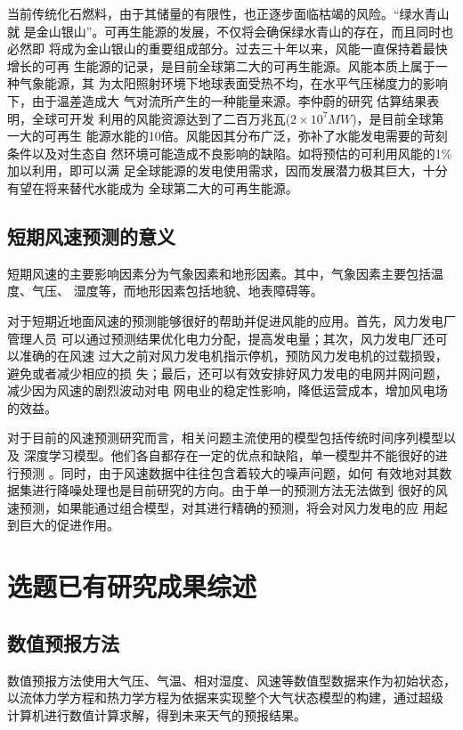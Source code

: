 \documentclass[AutoFakeBold]{LZUThesis}
\begin{document}
当前传统化石燃料，由于其储量的有限性，也正逐步面临枯竭的风险。“绿水青山就
是金山银山”。可再生能源的发展，不仅将会确保绿水青山的存在，而且同时也必然即
将成为金山银山的重要组成部分。过去三十年以来，风能一直保持着最快增长的可再
生能源的记录，是目前全球第二大的可再生能源。风能本质上属于一种气象能源，其
为太阳照射环境下地球表面受热不均，在水平气压梯度力的影响下，由于温差造成大
气对流所产生的一种能量来源。李仲蔚的研究
\cite{李仲蔚2019风力发电企业价值评估研究}估算结果表明，全球可开发
利用的风能资源达到了二百万兆瓦($2\times10^7MW$)，是目前全球第一大的可再生
能源水能的10倍。风能因其分布广泛，弥补了水能发电需要的苛刻条件以及对生态自
然环境可能造成不良影响的缺陷。如将预估的可利用风能的1\%加以利用，即可以满
足全球能源的发电使用需求，因而发展潜力极其巨大，十分有望在将来替代水能成为
全球第二大的可再生能源。

\subsection{短期风速预测的意义}
短期风速的主要影响因素分为气象因素和地形因素。其中，气象因素主要包括温度、气压、
湿度等，而地形因素包括地貌、地表障碍等。

对于短期近地面风速的预测能够很好的帮助并促进风能的应用。首先，风力发电厂管理人员
可以通过预测结果优化电力分配，提高发电量；其次，风力发电厂还可以准确的在风速
过大之前对风力发电机指示停机，预防风力发电机的过载损毁，避免或者减少相应的损
失；最后，还可以有效安排好风力发电的电网并网问题，减少因为风速的剧烈波动对电
网电业的稳定性影响，降低运营成本，增加风电场的效益。

对于目前的风速预测研究而言，相关问题主流使用的模型包括传统时间序列模型以及
深度学习模型。他们各自都存在一定的优点和缺陷，单一模型并不能很好的进行预测
\cite{陆冰鉴2020基于}。同时，由于风速数据中往往包含着较大的噪声问题，如何
有效地对其数据集进行降噪处理也是目前研究的方向。由于单一的预测方法无法做到
很好的风速预测，如果能通过组合模型，对其进行精确的预测，将会对风力发电的应
用起到巨大的促进作用。

\section{选题已有研究成果综述}
\subsection{数值预报方法}
数值预报方法使用大气压、气温、相对湿度、风速等数值型数据来作为初始状态，
以流体力学方程和热力学方程为依据来实现整个大气状态模型的构建，通过超级
计算机进行数值计算求解，得到未来天气的预报结果。
\cite{姜兆宇2019多时空尺度的风力发电预测方法综述}
\end{document}

